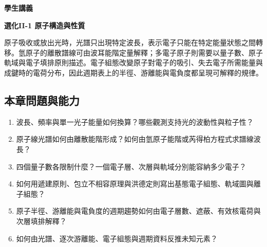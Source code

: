 \documentclass[11pt,a4paper]{article}
\providecommand{\tightlist}{%
  \setlength{\itemsep}{0pt}\setlength{\parskip}{0pt}}
\begin{document}
\begin{tcolorbox}[
  enhanced,colback=white,colframe=HandoutBlue,boxrule=1.1pt,arc=2mm,
  borderline west={3pt}{0pt}{HandoutBlue},left=5mm,right=4mm,top=4mm,bottom=4mm
]
{\sffamily\small\bfseries\color{HandoutBlue}學生講義}\par
{\sffamily\bfseries\LARGE\color{HandoutInk}選化II-1 原子構造與性質}\par
\vspace{0.35em}{\large 從光子與原子光譜建立量子化能階，再用軌域、電子組態與有效核吸引解釋元素的週期性}\par
{}\par
{}\par
\end{tcolorbox}


原子吸收或放出光時，光譜只出現特定波長，表示電子只能在特定能量狀態之間轉移。氫原子的離散譜線可由波耳能階定量解釋；多電子原子則需要以量子數、原子軌域與電子填排原則描述。電子組態改變原子對電子的吸引、失去電子所需能量與成鍵時的電荷分布，因此週期表上的半徑、游離能與電負度都呈現可解釋的規律。

\begin{HandoutLearningMap}

\subsection{本章問題與能力}\label{ux672cux7ae0ux554fux984cux8207ux80fdux529b}

\begin{enumerate}
\def\labelenumi{\arabic{enumi}.}
\tightlist
\item
  波長、頻率與單一光子能量如何換算？哪些觀測支持光的波動性與粒子性？
\item
  原子線光譜如何由離散能階形成？如何由氫原子能階或芮得柏方程式求譜線波長？
\item
  四個量子數各限制什麼？一個電子層、次層與軌域分別能容納多少電子？
\item
  如何用遞建原則、包立不相容原理與洪德定則寫出基態電子組態、軌域圖與離子組態？
\item
  原子半徑、游離能與電負度的週期趨勢如何由電子層數、遮蔽、有效核電荷與次層填排解釋？
\item
  如何由光譜、逐次游離能、電子組態與週期資料反推未知元素？
\end{enumerate}

\end{HandoutLearningMap}
\end{document}
